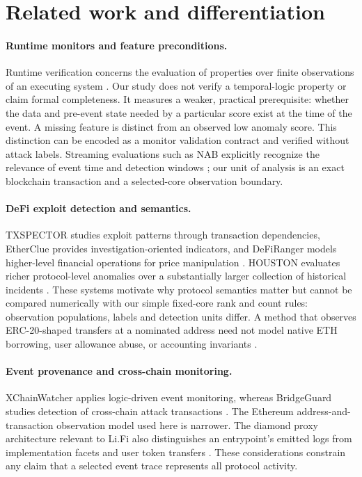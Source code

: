 \documentclass[preprint,12pt,authoryear]{elsarticle}
\begin{document}
\section{Related work and differentiation}\label{sec:related}

\paragraph{Runtime monitors and feature preconditions.} Runtime verification concerns the evaluation of properties over finite observations of an executing system \citep{Leucker2009RV,Bauer2011RV}. Our study does not verify a temporal-logic property or claim formal completeness. It measures a weaker, practical prerequisite: whether the data and pre-event state needed by a particular score exist at the time of the event. A missing feature is distinct from an observed low anomaly score. This distinction can be encoded as a monitor validation contract and verified without attack labels. Streaming evaluations such as NAB explicitly recognize the relevance of event time and detection windows \citep{Lavin2015NAB}; our unit of analysis is an exact blockchain transaction and a selected-core observation boundary.

\paragraph{DeFi exploit detection and semantics.} TXSPECTOR studies exploit patterns through transaction dependencies, EtherClue provides investigation-oriented indicators, and DeFiRanger models higher-level financial operations for price manipulation \citep{Zhang2020TxSpector,Aquilina2021EtherClue,Wu2024DeFiRanger}. HOUSTON evaluates richer protocol-level anomalies over a substantially larger collection of historical incidents \citep{Meng2026Houston}. These systems motivate why protocol semantics matter but cannot be compared numerically with our simple fixed-core rank and count rules: observation populations, labels and detection units differ. A method that observes ERC-20-shaped transfers at a nominated address need not model native ETH borrowing, user allowance abuse, or accounting invariants \citep{Vogelsteller2015ERC20,Revest2022Postmortem,Rari2022Postmortem}.

\paragraph{Event provenance and cross-chain monitoring.} XChainWatcher applies logic-driven event monitoring, whereas BridgeGuard studies detection of cross-chain attack transactions \citep{Augusto2025XChainWatcher,Wu2025BridgeGuard}. The Ethereum address-and-transaction observation model used here is narrower. The diamond proxy architecture relevant to Li.Fi also distinguishes an entrypoint's emitted logs from implementation facets and user token transfers \citep{Mudge2020ERC2535,BlockSec2022LiFi}. These considerations constrain any claim that a selected event trace represents all protocol activity.
\end{document}
